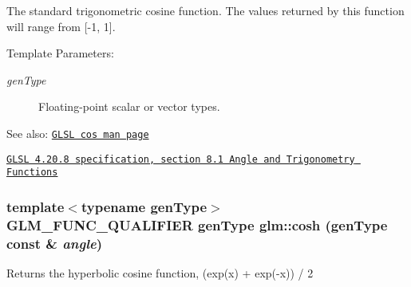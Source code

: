 The standard trigonometric cosine function. The values returned by this function will range from \mbox{[}-1, 1\mbox{]}.

\begin{Desc}
\item[Template Parameters:]
\begin{description}
\item[{\em genType}]Floating-point scalar or vector types.\end{description}
\end{Desc}
\begin{Desc}
\item[See also:]\href{http://www.opengl.org/sdk/docs/manglsl/xhtml/cos.xml}{\tt GLSL cos man page} 

\href{http://www.opengl.org/registry/doc/GLSLangSpec.4.20.8.pdf}{\tt GLSL 4.20.8 specification, section 8.1 Angle and Trigonometry Functions} \end{Desc}
\hypertarget{group__core__func__trigonometric_g522e0c2f8dbac0df60a2bf436fb88e69}{
\subsubsection[cosh]{\setlength{\rightskip}{0pt plus 5cm}template$<$typename genType$>$ GLM\_\-FUNC\_\-QUALIFIER genType glm::cosh (genType const \& {\em angle})}}
\label{group__core__func__trigonometric_g522e0c2f8dbac0df60a2bf436fb88e69}


Returns the hyperbolic cosine function, (exp(x) + exp(-x)) / 2

